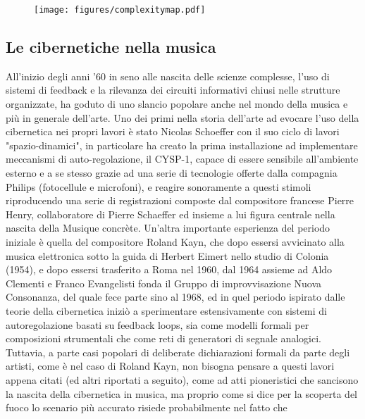 \clearpage

\begin{figure}[!h]
    \centering
    \texttt{[image: figures/complexitymap.pdf]}
    \label{fig:figure}
\end{figure}

\clearpage

\subsection{Le cibernetiche nella musica}
\label{sec:Le cibernetiche nella musica}
All'inizio degli anni '60 in seno alle nascita delle scienze complesse,
l'uso di sistemi di feedback e la rilevanza dei circuiti informativi chiusi
nelle strutture organizzate,
ha goduto di uno slancio popolare anche nel mondo della musica e più in generale dell'arte.
Uno dei primi nella storia dell'arte ad evocare l'uso della cibernetica nei propri lavori è stato
Nicolas Schoeffer con il suo ciclo di lavori "spazio-dinamici", in particolare ha creato
la prima installazione ad implementare meccanismi di auto-regolazione, il CYSP-1,
capace di essere sensibile all'ambiente esterno e a se stesso
grazie ad una serie di tecnologie offerte dalla compagnia Philips (fotocellule e microfoni),
e reagire sonoramente a questi stimoli riproducendo
una serie di registrazioni composte dal compositore francese Pierre Henry,
collaboratore di Pierre Schaeffer ed insieme a lui figura centrale nella nascita della Musique concrète.
Un'altra importante esperienza del periodo iniziale è quella del compositore Roland Kayn,
che dopo essersi avvicinato alla musica elettronica sotto la guida di Herbert Eimert
nello studio di Colonia (1954),
e dopo essersi trasferito a Roma nel 1960, dal 1964 assieme ad Aldo Clementi e Franco Evangelisti
fonda il Gruppo di improvvisazione Nuova Consonanza, del quale fece parte sino al 1968,
ed in quel periodo ispirato dalle teorie della cibernetica iniziò a sperimentare
estensivamente con sistemi di autoregolazione basati su feedback loops,
sia come modelli formali per composizioni strumentali che come reti di generatori di segnale analogici.
Tuttavia, a parte casi popolari di deliberate dichiarazioni formali da parte degli artisti,
come è nel caso di Roland Kayn,
non bisogna pensare a questi lavori appena citati (ed altri riportati a seguito),
come ad atti pioneristici che sancisono la nascita della cibernetica in musica,
ma proprio come si dice per la scoperta del fuoco
lo scenario più accurato risiede probabilmente nel fatto che
